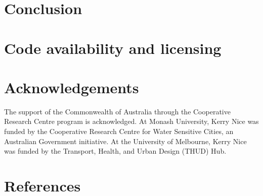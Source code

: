 \documentclass[final,3p,times,authoryear]{elsarticle}
\begin{document}
\section{Conclusion}\label{sec:conclusion}


\section{Code availability and licensing}\label{sec:available}





\section*{Acknowledgements}
The support of the Commonwealth of Australia through the Cooperative Research Centre program is acknowledged. At Monash University, Kerry Nice was funded by the Cooperative Research Centre for Water Sensitive Cities, an Australian Government initiative. At the University of Melbourne, Kerry Nice was funded by the Transport, Health, and Urban Design (THUD) Hub. 
 

\section*{References}\label{sec:ref}
   
  


%
%
%
\end{document}
